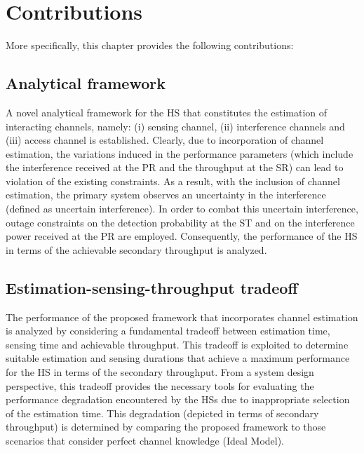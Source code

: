 \section{Contributions}
More specifically, this chapter provides the following contributions:

\subsection{Analytical framework}
A novel analytical framework for the HS that constitutes the estimation of interacting channels, namely: (i) sensing channel, (ii) interference channels and (iii) access channel is established. Clearly, due to incorporation of channel estimation, the variations induced in the performance parameters (which include the interference received at the PR and the throughput at the SR) can lead to violation of the existing constraints. As a result, with the inclusion of channel estimation, the primary system observes an uncertainty in the interference (defined as uncertain interference). 
In order to combat this uncertain interference, outage constraints on the detection probability at the ST and on the interference power received at the PR are employed. Consequently, the performance of the HS in terms of the achievable secondary throughput is analyzed.
\subsection{Estimation-sensing-throughput tradeoff}
The performance of the proposed framework that incorporates channel estimation is analyzed by considering a fundamental tradeoff between estimation time, sensing time and achievable throughput. This tradeoff is exploited to determine suitable estimation and sensing durations that achieve a maximum performance for the HS in terms of the secondary throughput. From a system design perspective, this tradeoff provides the necessary tools for evaluating the performance degradation encountered by the HSs due to inappropriate selection of the estimation time. This degradation (depicted in terms of secondary throughput) is determined by comparing the proposed framework to those scenarios that consider perfect channel knowledge (Ideal Model).  

